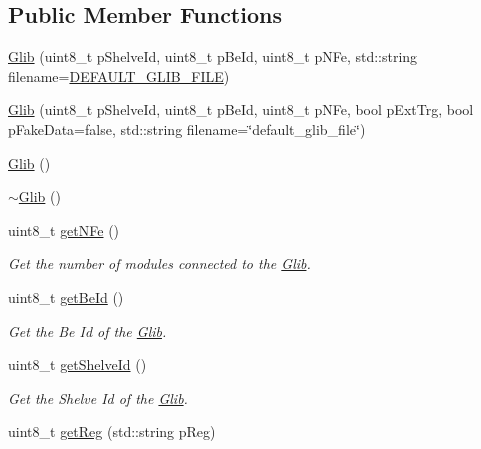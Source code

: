 \subsection*{Public Member Functions}
\begin{DoxyCompactItemize}
\item 
\hyperlink{class_ph2___hw_description_1_1_glib_a07910146af6c6c3f4bf31f9985ab28f8}{Glib} (uint8\-\_\-t p\-Shelve\-Id, uint8\-\_\-t p\-Be\-Id, uint8\-\_\-t p\-N\-Fe, std\-::string filename=\hyperlink{_definition_8h_a9a33e5f7e6ec12c2dd3f55317c6c16f1}{D\-E\-F\-A\-U\-L\-T\-\_\-\-G\-L\-I\-B\-\_\-\-F\-I\-L\-E})
\item 
\hyperlink{class_ph2___hw_description_1_1_glib_a05a22fe40ace0d74f5493cbded54bd99}{Glib} (uint8\-\_\-t p\-Shelve\-Id, uint8\-\_\-t p\-Be\-Id, uint8\-\_\-t p\-N\-Fe, bool p\-Ext\-Trg, bool p\-Fake\-Data=false, std\-::string filename=\char`\"{}default\-\_\-glib\-\_\-file\char`\"{})
\item 
\hyperlink{class_ph2___hw_description_1_1_glib_a2d9eece9012cdc452f43895852693329}{Glib} ()
\item 
\hyperlink{class_ph2___hw_description_1_1_glib_a2fa668cf8b827199d63be060616a70cd}{$\sim$\-Glib} ()
\item 
uint8\-\_\-t \hyperlink{class_ph2___hw_description_1_1_glib_a2675c993dad690792592ba3e30036bab}{get\-N\-Fe} ()
\begin{DoxyCompactList}\small\item\em Get the number of modules connected to the \hyperlink{class_ph2___hw_description_1_1_glib}{Glib}. \end{DoxyCompactList}\item 
uint8\-\_\-t \hyperlink{class_ph2___hw_description_1_1_glib_a27f5e85e68f25e56d1096306e3f70188}{get\-Be\-Id} ()
\begin{DoxyCompactList}\small\item\em Get the Be Id of the \hyperlink{class_ph2___hw_description_1_1_glib}{Glib}. \end{DoxyCompactList}\item 
uint8\-\_\-t \hyperlink{class_ph2___hw_description_1_1_glib_ac3130c4a08d624c6d89fc66474efd6d8}{get\-Shelve\-Id} ()
\begin{DoxyCompactList}\small\item\em Get the Shelve Id of the \hyperlink{class_ph2___hw_description_1_1_glib}{Glib}. \end{DoxyCompactList}\item 
uint8\-\_\-t \hyperlink{class_ph2___hw_description_1_1_glib_ade845c9d6a9fcaaac1766cf89592fb97}{get\-Reg} (std\-::string p\-Reg)

\end{DoxyCompactItemize}
